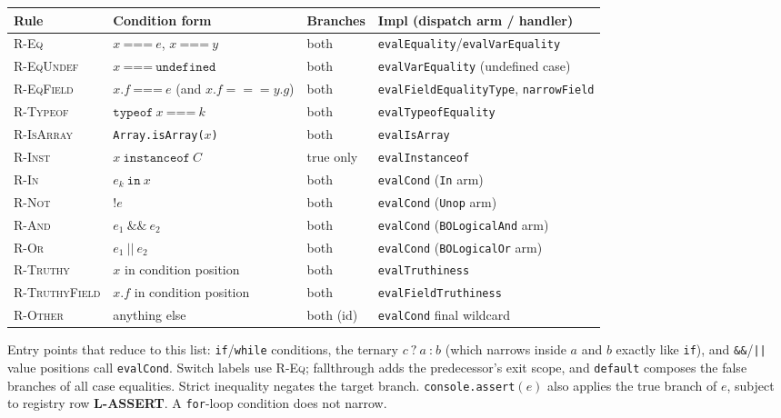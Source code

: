 \documentclass[11pt]{article}
\begin{document}
\begin{keydef}
\renewcommand{\arraystretch}{1.2}
\small
\begin{tabular}{@{}l@{\;\;}l@{\;\;}l@{\;\;}l@{}}
\toprule
\textbf{Rule} & \textbf{Condition form} & \textbf{Branches} & \textbf{Impl (dispatch arm / handler)} \\
\midrule
\textsc{R-Eq} & $x\ \texttt{===}\ e$, $x\ \texttt{===}\ y$ & both &
  \texttt{evalEquality}/\texttt{evalVarEquality} \\
\textsc{R-EqUndef} & $x\ \texttt{===}\ \texttt{undefined}$ & both &
  \texttt{evalVarEquality} (undefined case) \\
\textsc{R-EqField} & $x.f\ \texttt{===}\ e$ (and $x.f === y.g$) & both &
  \texttt{evalFieldEqualityType}, \texttt{narrowField} \\
\textsc{R-Typeof} & $\texttt{typeof}\ x\ \texttt{===}\ k$ & both &
  \texttt{evalTypeofEquality} \\
\textsc{R-IsArray} & \texttt{Array.isArray(}$x$\texttt{)} & both &
  \texttt{evalIsArray} \\
\textsc{R-Inst} & $x\ \texttt{instanceof}\ C$ & true only &
  \texttt{evalInstanceof} \\
\textsc{R-In} & $e_k\ \texttt{in}\ x$ & both &
  \texttt{evalCond} (\texttt{In} arm) \\
\textsc{R-Not} & $\texttt{!}e$ & both & \texttt{evalCond} (\texttt{Unop} arm)\\
\textsc{R-And} & $e_1\ \texttt{\&\&}\ e_2$ & both &
  \texttt{evalCond} (\texttt{BOLogicalAnd} arm) \\
\textsc{R-Or} & $e_1\ \texttt{||}\ e_2$ & both &
  \texttt{evalCond} (\texttt{BOLogicalOr} arm) \\
\textsc{R-Truthy} & $x$ in condition position & both &
  \texttt{evalTruthiness} \\
\textsc{R-TruthyField} & $x.f$ in condition position & both &
  \texttt{evalFieldTruthiness} \\
\textsc{R-Other} & anything else & both (id) &
  \texttt{evalCond} final wildcard \\
\bottomrule
\end{tabular}
\end{keydef}

\noindent
Entry points that reduce to this list: \texttt{if}/\texttt{while} conditions,
the ternary $c\ \texttt{?}\ a\ \texttt{:}\ b$ (which narrows inside $a$ and
$b$ exactly like \texttt{if}), and \texttt{\&\&}/\texttt{||} value positions
call \texttt{evalCond}. Switch labels use \textsc{R-Eq}; fallthrough adds the
predecessor's exit scope, and \texttt{default} composes the false branches of
all case equalities. Strict inequality negates the target branch.
\texttt{console.assert}$(e)$ also applies the true branch of $e$, subject to
registry row \textbf{L-ASSERT}. A \texttt{for}-loop condition does not narrow.
\end{document}

